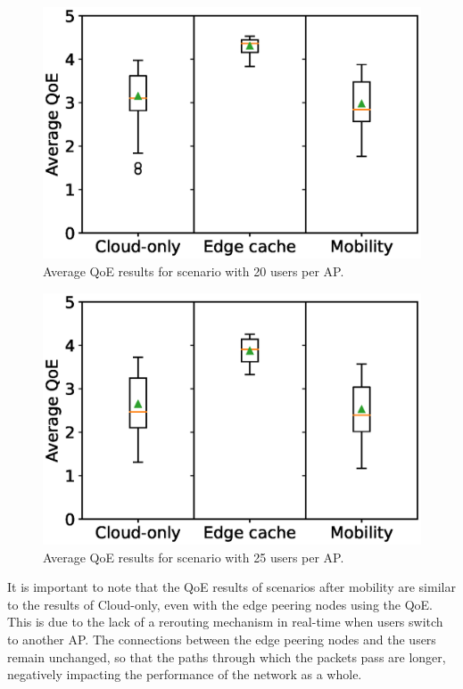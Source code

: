 \begin{figure}[!h]
    \centering
    \includegraphics[width=\linewidth]{images/QoEBoxplot-20u-2.eps}
    \vspace{-0.6cm}
    \caption{Average QoE results for scenario with 20 users per AP.}
    \label{fig:exp-boxplot-20}
\end{figure}

\begin{figure}[!h]
    \centering
    \includegraphics[width=\linewidth]{images/QoEBoxplot-25u-2.eps}
    \vspace{-0.6cm}
    \caption{Average QoE results for scenario with 25 users per AP.}
    \label{fig:exp-boxplot-25}
\end{figure}


It is important to note that the QoE results of scenarios after mobility are similar to the results of Cloud-only, even with the edge peering nodes using the QoE. This is due to the lack of a rerouting mechanism in real-time when users switch to another AP. The connections between the edge peering nodes and the users remain unchanged, so that the paths through which the packets pass are longer, negatively impacting the performance of the network as a whole.

